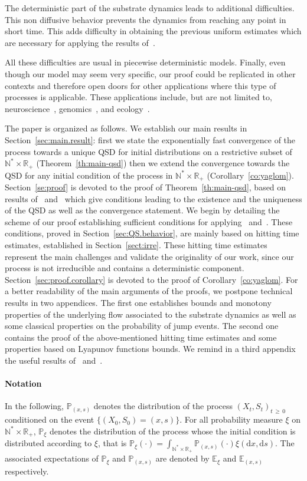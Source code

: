 \documentclass[10pt]{amsart}
\theoremstyle{definition}\newtheorem{defi}[theo]{Definition}\newtheorem{rema}[theo]{Remark}\newtheorem{exam}[theo]{Example}\newtheorem{exem}[theo]{Example}\newtheorem{nota}[theo]{Notation}
\newcommand{\PP}{\mathbb{P}}
\newcommand{\RR}{\mathbb{R}}
\newcommand{\NN}{\mathbb{N}}
\newcommand{\EE}{\mathbb{E}}
\newcommand{\dif}{\mathrm{d}}
\newcommand{\1}{\mathbf{1}}
\begin{document}
The deterministic part of the substrate dynamics leads to additional difficulties. This non diffusive behavior prevents the dynamics from reaching any point in short time. This adds difficulty in obtaining the previous uniform estimates which are necessary for applying the results of~\cite{BCGM,CV20}.


All these difficulties are usual in piecewise deterministic models. Finally, even though our model may seem very specific, our proof could be replicated in other contexts and therefore open doors for other applications where this type of processes is applicable. These applications include, but are not limited to, neuroscience~\cite{GL15, PTW}, genomics~\cite{G12, H17}, and ecology~\cite{C16}.


The paper is organized as follows. We establish our main results in Section~\ref{sec:main.result}: first we state the exponentially fast convergence of the process towards a unique QSD for initial distributions on a restrictive subset of $\NN^*\times \RR_+$ (Theorem~\ref{th:main-qsd}) then we extend the convergence towards the QSD for any initial condition of the process in $\NN^*\times \RR_+$ (Corollary~\ref{co:yaglom}). Section~\ref{se:proof} is devoted to the proof of Theorem~\ref{th:main-qsd}, based on results of~\cite{BCGM} and~\cite{CV20} which give conditions leading to the existence and the uniqueness of the QSD as well as the convergence statement. We begin by detailing the scheme of our proof establishing sufficient conditions for applying~\cite{BCGM} and~\cite{CV20}. These conditions, proved in Section~\ref{sec:QS.behavior}, are mainly based on hitting time estimates, established in Section~\ref{sect:irre}. These hitting time estimates represent the main challenges and validate the originality of our work, since our process is not irreducible and contains a deterministic component. Section~\ref{sec:proof.corollary} is devoted to the proof of Corollary~\ref{co:yaglom}. For a better readability of the main arguments of the proofs, we postpone technical results in two appendices. The first one establishes bounds and monotony properties of the underlying flow associated to the substrate dynamics as well as some classical properties on the probability of jump events. The second one contains the proof of the above-mentioned hitting time estimates and some properties based on Lyapunov functions bounds. We remind in a third appendix the useful results of~\cite{BCGM} and~\cite{CV20}.



\paragraph{Notation}
In the following, $\PP_{(x,s)}$ denotes the distribution of the process $(X_t,S_t)_{t\,\geq\,0}$ conditioned on the event $\{ (X_0,S_0) = (x,s)\}$. For all probability measure $\xi$ on $\NN^*\times \RR_+$, $\PP_\xi $ denotes the distribution of the process whose the initial condition is distributed according to $\xi$, that is $\PP_\xi (\cdot) = \int_{\NN^*\times \RR_+} \PP_{(x,s)} (\cdot) \xi(\dif x,\dif s)$. The associated expectations of $\PP_\xi $ and $\PP_{(x,s)}$ are denoted by $\EE_{\xi}$ and $\EE_{(x,s)}$ respectively.
\end{document}
